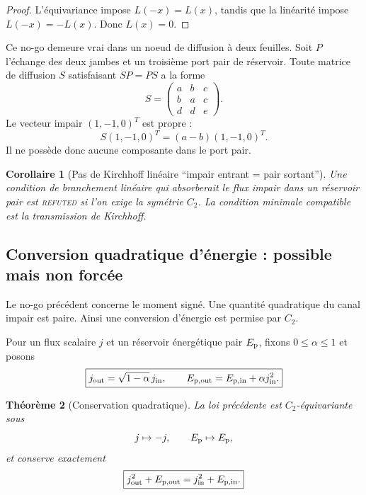 \documentclass[11pt,a4paper]{article}
\newtheorem{theorem}{Théorème}[section]
\newtheorem{corollary}[theorem]{Corollaire}
\begin{document}
\begin{proof}
L'équivariance impose $L(-x)=L(x)$, tandis que la linéarité impose $L(-x)=-L(x)$. Donc $L(x)=0$.
\end{proof}

Ce no-go demeure vrai dans un noeud de diffusion à deux feuilles. Soit $P$ l'échange des deux jambes et un troisième port pair de réservoir. Toute matrice de diffusion $S$ satisfaisant $SP=PS$ a la forme
\[
 \boxed{
 S=
 \begin{pmatrix}
 a&b&c\\
 b&a&c\\
 d&d&e
 \end{pmatrix}.}
\]
Le vecteur impair $(1,-1,0)^T$ est propre :
\[
 S(1,-1,0)^T=(a-b)(1,-1,0)^T.
\]
Il ne possède donc aucune composante dans le port pair.

\begin{corollary}[Pas de Kirchhoff linéaire ``impair entrant = pair sortant'']\label{cor:v19-linear-conversion-refuted}
Une condition de branchement linéaire qui absorberait le flux impair dans un réservoir pair est \textsc{refuted} si l'on exige la symétrie $C_2$. La condition minimale compatible est la transmission de Kirchhoff.
\end{corollary}

\subsection{Conversion quadratique d'énergie : possible mais non forcée}

Le no-go précédent concerne le moment signé. Une quantité quadratique du canal impair est paire. Ainsi une conversion d'énergie est permise par $C_2$.

Pour un flux scalaire $j$ et un réservoir énergétique pair $E_{\rm p}$, fixons $0\le\alpha\le1$ et posons
\begin{equation}\label{eq:v19-quadratic-converter}
 \boxed{
 j_{\rm out}
 =
 \sqrt{1-\alpha}\,j_{\rm in},
 \qquad
 E_{\rm p,out}
 =
 E_{\rm p,in}
 +
 \alpha j_{\rm in}^2.}
\end{equation}

\begin{theorem}[Conservation quadratique]\label{thm:v19-quadratic-conservation}
La loi précédente est $C_2$-équivariante sous
\[
 j\mapsto-j,\qquad E_{\rm p}\mapsto E_{\rm p},
\]
et conserve exactement
\[
 \boxed{
 j_{\rm out}^2+E_{\rm p,out}
 =
 j_{\rm in}^2+E_{\rm p,in}.}
\]
\end{theorem}
\end{document}
